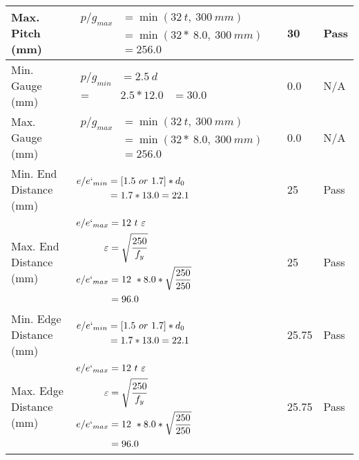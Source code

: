 \documentclass{article}%
\begin{document}
\begin{longtable}{|p{4cm}|p{5cm}|p{5.5cm}|p{1.5cm}|}
\hline%
Max. Pitch (mm)&$\begin{aligned}p/g_{max} &=\min(32~t,~300~mm)&\\ &=\min(32 *~8.0,~ 300 ~mm)\\&=256.0\end{aligned}$&30&Pass\\%
\hline%
Min. Gauge (mm)&$\begin{aligned}p/g_{min}&= 2.5 ~ d&\\ =&2.5*12.0&=30.0\end{aligned}$&0.0&N/A\\%
\hline%
Max. Gauge (mm)&$\begin{aligned}p/g_{max} &=\min(32~t,~300~mm)&\\ &=\min(32 *~8.0,~ 300 ~mm)\\&=256.0\end{aligned}$&0.0&N/A\\%
\hline%
Min. End Distance (mm)&$\begin{aligned}e/e`_{min} &=[1.5~or~ 1.7] * d_0\\ &=1.7*13.0=22.1 \end{aligned}$&25&Pass\\%
\hline%
Max. End Distance (mm)&$\begin{aligned}e/e`_{max} &= 12~ t~ \varepsilon&\\ \varepsilon &= \sqrt{\frac{250}{f_y}}\\ e/e`_{max}&=12 ~*8.0*\sqrt{\frac{250}{250}}\\ &=96.0\\ \end{aligned}$&25&Pass\\%
\hline%
Min. Edge Distance (mm)&$\begin{aligned}e/e`_{min} &=[1.5~or~ 1.7] * d_0\\ &=1.7*13.0=22.1 \end{aligned}$&25.75&Pass\\%
\hline%
Max. Edge Distance (mm)&$\begin{aligned}e/e`_{max} &= 12~ t~ \varepsilon&\\ \varepsilon &= \sqrt{\frac{250}{f_y}}\\ e/e`_{max}&=12 ~*8.0*\sqrt{\frac{250}{250}}\\ &=96.0\\ \end{aligned}$&25.75&Pass\\%
\hline%

\end{longtable}
\end{document}

